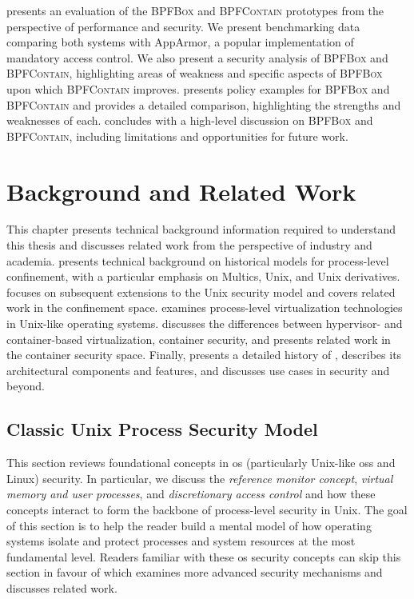 \documentclass[
  fontsize=12pt,
  titlepage=firstiscover,
  paper=letter,
oneside,
  cleardoublepage=plain,
  parskip=half-,
  DIV=10,
  parindent,
  appendixprefix,
  chapterprefix,
  listof=totoc,
]{scrbook}
\newcommand{\bpfbox}{\textsc{BPFBox}}
\newcommand{\bpfcontain}{\textsc{BPFContain}}
\begin{document}
 presents an evaluation of the \bpfbox{} and \bpfcontain{} prototypes
from the perspective of performance and security. We present benchmarking data comparing
both systems with AppArmor, a popular  implementation of mandatory
access control. We also present a security analysis of \bpfbox{} and \bpfcontain{},
highlighting areas of weakness and specific aspects of \bpfbox{} upon which \bpfcontain{}
improves.   presents policy examples for \bpfbox{} and \bpfcontain{}
and provides a detailed comparison, highlighting the strengths and weaknesses of each.
 concludes with a high-level discussion on \bpfbox{} and \bpfcontain{},
including limitations and opportunities for future work.

 
\chapter{Background and Related Work}\label{c:background}
This chapter presents technical background information required to understand this thesis
and discusses related work from the perspective of industry and academia.
 presents technical background on historical models for
process-level confinement, with a particular emphasis on Multics, Unix, and Unix
derivatives.   focuses on subsequent extensions to the Unix
security model and covers related work in the confinement space. 
examines process-level virtualization technologies in Unix-like operating systems.
 discusses the differences between hypervisor- and container-based
virtualization, container security, and presents related work in the container security
space. Finally,  presents a detailed history of ,
describes its architectural components and features, and discusses use cases in security
and beyond.

\section{Classic Unix Process Security Model}\label{s:process-security-model}

This section reviews foundational concepts in \gls{os} (particularly Unix-like \gls{os}s
and Linux) security. In particular, we discuss the \textit{reference monitor concept},
\textit{virtual memory and user processes}, and \textit{discretionary access control} and
how these concepts interact to form the backbone of process-level security in Unix.  The
goal of this section is to help the reader build a mental model of how operating systems
isolate and protect processes and system resources at the most fundamental level. Readers
familiar with these \gls{os} security concepts can skip this section in favour of
 which examines more advanced security mechanisms and
discusses related work.
\end{document}
